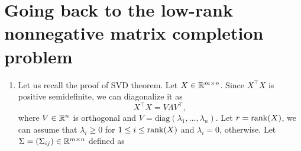 \section{Going back to the low-rank nonnegative matrix completion problem}

\begin{enumerate}
  \item Let us recall the proof of SVD theorem. Let $X\in{\mathbb{R}}^{m\times n}$. Since $X^\top X$ is positive semidefinite, we can diagonalize it as
        $$X^\top X = V\Lambda V^\top,$$
        where $V\in{\mathbb{R}}^n$ is orthogonal and $V = \mathrm{diag}(\lambda_1,\ldots, \lambda_n)$. Let $r=\mathrm{rank}(X)$, we can assume that $\lambda_{i} \ge 0$ for $1\le i \le \mathrm{rank}(X)$ and $\lambda_i = 0$, otherwise. Let $\Sigma = (\Sigma_{ij}) \in {\mathbb{R}}^{m\times n}$ defined as


\end{enumerate}

